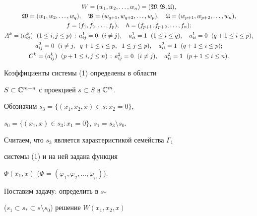\begin{gather*}


W=(w_1,w_2,\dotsc,w_n)=(\frak W,\frak B,\frak U),\\


\frak W=(w_1,w_2,\dotsc,w_q),\quad


\frak B=(w_{q+1},w_{q+2},\dotsc,w_p),\quad


\frak U=(w_{p+1},w_{p+2},\dotsc,w_n),\\


f=(f_1,f_2,\dotsc,f_p),\quad


h=(f_{p+1},f_{p+2},\dotsc,f_n);\\


%


A^k=(a^k_{ij}) \ \;(1\le i,j\le p)\,:\,


a^1_{ij}=0\ \;(i\ne j),\quad a^1_{ii}=1 \ \;(1\le i\le q),


\quad a^1_{ii}=0 \ \;(q+1\le i\le p),\\


a^2_{ij}=0 \ \; (i\ne j, \ \; q+1\le i\le p,\ \; 1\le j\le p),\quad


a^2_{ii}=1 \ \; (q+1\le i\le p);\\


C^k=(a^k_{ij}) \ \;(p+1\le i,j\le n)\,:\,


a^2_{ij}=0\ \;(i\ne j),\quad a^2_{ii}=1 \ \;


(p+1\le i\le n).


\end{gather*}


Коэффициенты системы (1) определены в области


$S\subset\Bbb C^{m+n}$ с проекцией $s\subset S$ в $\Bbb C^m$.


Обозначим $s_3=\{(x_1,x_2,x)\in s:x_2=0\}$,


$s_0=\{(x_1,x)\in s_3:x_1=0\}$, $s_1=s_3\setminus s_0$.





Считаем, что $s_3$ является характеристикой семейства $\Gamma_1$


системы (1) и на ней задана функция


$\Phi(x_1,x)$ ($\Phi=(\varphi_1,\varphi_2,\dotsc,\varphi_n)$).





Поставим задачу: определить в $s_*$


($s_1\subset s_*\subset s\setminus s_0$) решение $W(x_1,x_2,x)$


